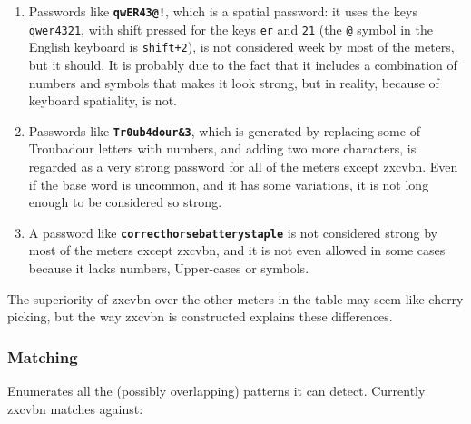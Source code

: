 \begin{enumerate}
\setlength\itemsep{0pt}
\item Passwords like \texttt{\textbf{qwER43@!}}, which is a spatial password: it uses the keys \texttt{qwer4321}, with shift pressed for the keys \texttt{er} and \texttt{21} (the \texttt{@} symbol in the English keyboard is \texttt{shift+2}), is not considered week by most of the meters, but it should. It is probably due to the fact that it includes a combination of numbers and symbols that makes it look strong, but in reality, because of keyboard spatiality, is not.

\item Passwords like \texttt{\textbf{Tr0ub4dour\&3}}, which is generated by replacing some of Troubadour letters with numbers, and adding two more characters, is regarded as a very strong password for all of the meters except zxcvbn. Even if the base word is uncommon, and it has some variations, it is not long enough to be considered so strong.
\item A password like \texttt{\textbf{correcthorsebatterystaple}} is not considered strong by most of the meters except zxcvbn, and it is not even allowed in some cases because it lacks numbers, Upper-cases or symbols.
\end{enumerate}

The superiority of zxcvbn over the other meters in the table may seem like cherry picking, but the way zxcvbn is constructed explains these differences.

\subsubsection*{Matching}

Enumerates all the (possibly overlapping) patterns it can detect. Currently zxcvbn matches against:

